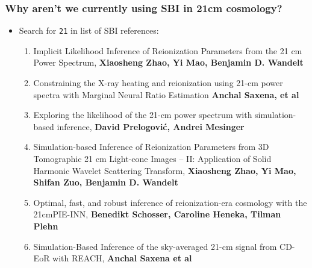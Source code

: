 \documentclass[aspectratio=169]{beamer}
\begin{document}
\begin{frame}
    \frametitle{Why aren't we currently using SBI in 21cm cosmology?}
    \begin{itemize}
        \item Search for \texttt{21} in list of SBI references:~
            \begin{enumerate}
                \item {} Implicit Likelihood Inference of Reionization Parameters from the 21 cm Power Spectrum, \textbf{Xiaosheng Zhao, Yi Mao, Benjamin D. Wandelt}
                \item {} Constraining the X-ray heating and reionization using 21-cm power spectra with Marginal Neural Ratio Estimation \textbf{Anchal Saxena, et al}
                \item {} Exploring the likelihood of the 21-cm power spectrum with simulation-based inference, \textbf{David Prelogović, Andrei Mesinger}
                \item {} Simulation-based Inference of Reionization Parameters from 3D Tomographic 21 cm Light-cone Images -- II: Application of Solid Harmonic Wavelet Scattering Transform, \textbf{Xiaosheng Zhao, Yi Mao, Shifan Zuo, Benjamin D. Wandelt}
                \item {} Optimal, fast, and robust inference of reionization-era cosmology with the 21cmPIE-INN, \textbf{Benedikt Schosser, Caroline Heneka, Tilman Plehn}
                \item {} Simulation-Based Inference of the sky-averaged 21-cm signal from CD-EoR with REACH, \textbf{Anchal Saxena et al}
            \end{enumerate}
    \end{itemize}
\end{frame}
\end{document}
